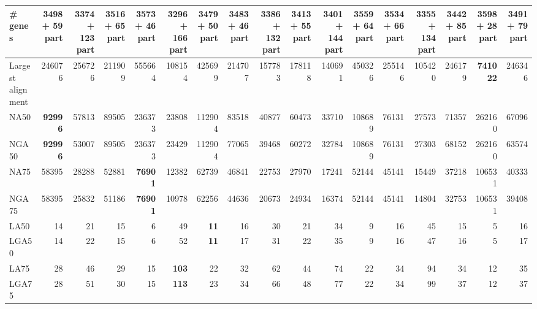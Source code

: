 \documentclass[12pt,a4paper]{article}
\begin{document}
\begin{table}[ht]
\begin{center}
\begin{tabular}{|l*{16}{|r}|}
\# genes & 3498 + 59 part & 3374 + 123 part & 3516 + 65 part & 3573 + 46 part & 3296 + 166 part & 3479 + 50 part & 3483 + 46 part & 3386 + 132 part & 3413 + 55 part & 3401 + 144 part & 3559 + 64 part & 3534 + 66 part & 3355 + 134 part & 3442 + 85 part & {\bf 3598 + 28 part} & 3491 + 79 part \\ \hline
Largest alignment & 246076 & 256726 & 211909 & 555664 & 108154 & 425699 & 214707 & 157783 & 178118 & 140691 & 450326 & 255146 & 105420 & 246179 & {\bf 741022} & 246346 \\ \hline
NA50 & {\bf 92996} & 57813 & 89505 & 236373 & 23808 & 112904 & 83518 & 40877 & 60473 & 33710 & 108689 & 76131 & 27573 & 71357 & 262160 & 67096 \\ \hline
NGA50 & {\bf 92996} & 53007 & 89505 & 236373 & 23429 & 112904 & 77065 & 39468 & 60272 & 32784 & 108689 & 76131 & 27303 & 68152 & 262160 & 63574 \\ \hline
NA75 & 58395 & 28288 & 52881 & {\bf 76901} & 12382 & 62739 & 46841 & 22753 & 27970 & 17241 & 52144 & 45141 & 15449 & 37218 & 106531 & 40333 \\ \hline
NGA75 & 58395 & 25832 & 51186 & {\bf 76901} & 10978 & 62256 & 44636 & 20673 & 24934 & 16374 & 52144 & 45141 & 14804 & 32753 & 106531 & 39408 \\ \hline
LA50 & 14 & 21 & 15 & 6 & 49 & {\bf 11} & 16 & 30 & 21 & 34 & 9 & 16 & 45 & 15 & 5 & 16 \\ \hline
LGA50 & 14 & 22 & 15 & 6 & 52 & {\bf 11} & 17 & 31 & 22 & 35 & 9 & 16 & 47 & 16 & 5 & 17 \\ \hline
LA75 & 28 & 46 & 29 & 15 & {\bf 103} & 22 & 32 & 62 & 44 & 74 & 22 & 34 & 94 & 34 & 12 & 35 \\ \hline
LGA75 & 28 & 51 & 30 & 15 & {\bf 113} & 23 & 34 & 66 & 48 & 77 & 22 & 34 & 99 & 37 & 12 & 37 \\ \hline
\end{tabular}
\end{center}
\end{table}
\end{document}
